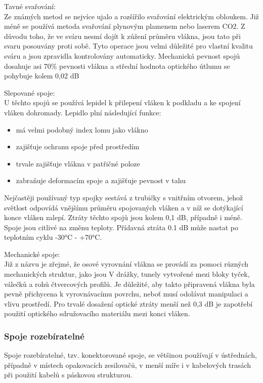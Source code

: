 Tavné svařování: \\
Ze známých metod se nejvíce ujalo a rozšířilo svařování elektrickým obloukem. Již méně se používá metoda svařování plynovým plamenem nebo laserem CO2. Z důvodu toho, že ve sváru nesmí dojít k zúžení průměru vlákna, jsou tato při svaru posouvány proti sobě. Tyto operace jsou velmi důležité pro vlastní kvalitu sváru a jsou zpravidla kontrolovány automaticky. Mechanická pevnost spojů dosahuje asi 70\% pevnosti vlákna a střední hodnota optického útlumu se pohybuje kolem 0,02 dB

Slepované spoje:\\
U těchto spojů se používá lepidel k přilepení vláken k podkladu a ke spojení vláken dohromady. Lepidlo plní následující funkce:
\begin{itemize}
    \item má velmi podobný index lomu jako vlákno
    \item zajišťuje ochranu spoje před prostředím
    \item trvale zajišťuje vlákna v patřičné poloze
    \item zabraňuje deformacím spoje a zajišťuje pevnost v tahu
\end{itemize}
Nejčastěji používaný typ spojky sestává z trubičky s vnitřním otvorem, jehož světlost odpovídá vnějšímu průměru spojovaných vláken a v níž se dotýkající konce vláken zalepí. Ztráty těchto spojů jsou kolem 0,1 dB, případně i méně. Spoje jsou citlivé na změnu
teploty. Přídavná ztráta 0.1 dB může nastat po teplotním cyklu -30°C - +70°C.

Mechanické spoje: \\
Již z názvu je zřejmé, že osové vyrovnání vlákna se provádí za pomoci různých mechanických struktur, jako jsou V drážky, tunely vytvořené mezi bloky tyček, válečků a rohů čtvercových profilů. Je důležité, aby takto připravená vlákna byla pevně přichycena k vyrovnávacímu povrchu, neboť musí odolávat manipulaci a vlivu prostředí. Pro trvalé dosažení optické ztráty menší než 0,3 dB je zapotřebí použití optického sdružovacího materiálu mezi konci vláken.

\subsubsection{Spoje rozebíratelné}
Spoje rozebíratelné, tzv. konektorované spoje, se většinou používají v ústřednách, případně v místech opakovacích zesilovačů, v menší míře i v kabelových trasách při použití kabelů s páskovou strukturou. 

